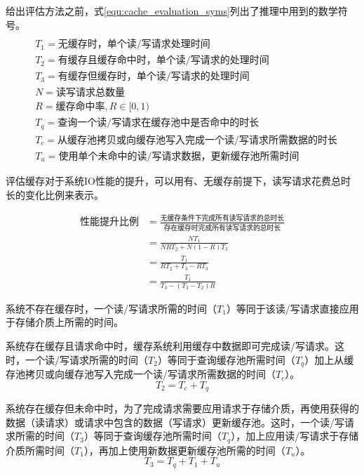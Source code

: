 给出评估方法之前，式\ref{equ:cache_evaluation_syms}列出了推理中用到的数学符号。
\begin{equation}
\begin{split}
\\&T_1=\mbox{无缓存时，单个读/写请求处理时间}
\\&T_2=\mbox{有缓存且缓存命中时，单个读/写请求的处理时间}
\\&T_3=\mbox{有缓存但缓存时，单个读/写请求的处理时间}
\\&N=\mbox{读写请求总数量}
\\&R=\mbox{缓存命中率},R\in\lbrack0,1)
\\&T_q=\mbox{查询一个读/写请求在缓存池中是否命中的时长}
\\&T_c=\mbox{从缓存池拷贝或向缓存池写入完成一个读/写请求所需数据的时长}
\\&T_u=\mbox{使用单个未命中的读/写请求数据，更新缓存池所需时间}
\end{split}
\label{equ:cache_evaluation_syms}
\end{equation}

评估缓存对于系统IO性能的提升，可以用有、无缓存前提下，读写请求花费总时长的变化比例来表示。

\begin{equation}
\begin{split}
\mbox{性能提升比例}&=\frac{\mbox{无缓存条件下完成所有读写请求的总时长}}{\mbox{存在缓存时完成所有读写请求的总时长}}
\\&=\frac{NT_1}{NRT_2+N(1-R)T_3}
\\&=\frac{T_1}{RT_2+T_3-RT_3}
\\&=\frac{T_1}{T_3-(T_3-T_2)R}
\end{split}
\label{equ:cache_evaluation_enhance1}
\end{equation}

系统不存在缓存时，一个读/写请求所需的时间（$T_1$）等同于该读/写请求直接应用于存储介质上所需的时间。

系统存在缓存且请求命中时，缓存系统利用缓存中数据即可完成读/写请求。这时，一个读/写请求所需的时间（$T_2$）等同于查询缓存池所需时间（$T_q$）加上从缓存池拷贝或向缓存池写入完成一个读/写请求所需数据的时间（$T_c$）。
\begin{equation}
T_2=T_c+T_q
\end{equation}

系统存在缓存但未命中时，为了完成请求需要应用请求于存储介质，再使用获得的数据（读请求）或请求中包含的数据（写请求）更新缓存池。这时，一个读/写请求所需的时间（$T_3$）等同于查询缓存池所需时间（$T_q$），加上应用读/写请求于存储介质所需时间（$T_1$），再加上使用新数据更新缓存池所需的时间（$T_u$）。
\begin{equation}
T_3=T_q+T_1+T_u
\end{equation}

